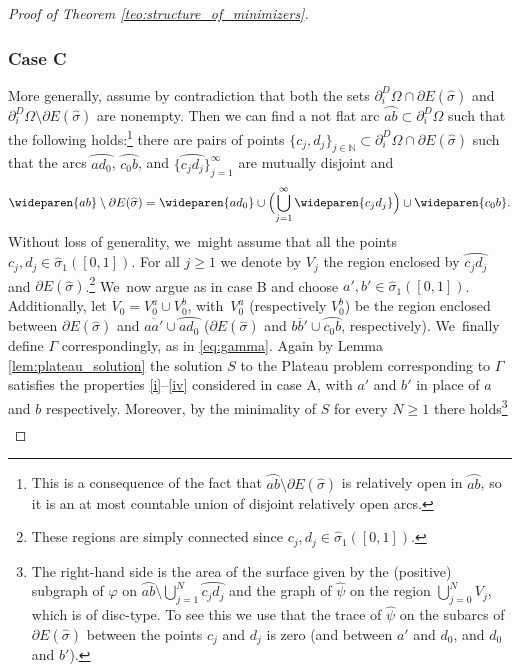 \documentclass[JEP,XML,SOM,Unicode, NoFloatCountersInSection,published]{cedram}
\let\arc\wideparen
\let\Om\Omega
\theoremstyle{definition}
\begin{document}
\begin{proof}[Proof of Theorem \ref{teo:structure_of_minimizers}]
\subsubsection*{Case C} More generally, assume by contradiction that both the sets $\partial_i^D\Om\cap\partial E(\widehat\sigma)$ and $\partial_i^D\Om\setminus\partial E(\widehat\sigma)$ are nonempty.
Then we can find a not flat arc $\arc{ab}\subset\partial_i^D\Om$ such that the following holds:\footnote{This is a consequence of the fact that $\arc{ab}\setminus\partial E(\widehat\sigma)$ is relatively open in $\arc{ab}$, so it is an at most countable union of disjoint relatively open arcs.} there are pairs of points $\{c_j,d_j\}_{j\in \mathbb N}\subset\partial_i^D\Om\cap\partial E(\widehat\sigma)$ such that the arcs $\arc{ad_0}$, $\arc{c_0b}$, and $\{\arc{c_jd_j}\}_{j=1}^\infty$ are mutually disjoint and
\begin{equation*}
\arc{ab}\setminus\partial E(\widehat\sigma)=\arc{ad_0}\cup\Bigl(\bigcup_{j=1}^\infty\arc{c_jd_j}\Bigr)\cup\arc{c_0b}.
\end{equation*}
Without loss of generality, we~might assume that all the points $c_j,d_j\in\widehat\sigma_1([0,1])$.
For all $j\ge1$ we denote by $V_j$ the region enclosed by $\arc{c_jd_j}$ and $\partial E(\widehat\sigma)$.\footnote{These regions are simply connected since $c_j,d_j\in\widehat\sigma_1([0,1])$.} We~now argue as in case B and choose $a',b'\in \widehat\sigma_1([0,1])$. Additionally, let $V_0=V_0^a\cup V_0^b$, with~$V_0^a$ (respectively $V_0^b$) be the region enclosed between $\partial E(\widehat\sigma)$ and $\overline{aa'}\cup\arc{ad_0}$ ($\partial E(\widehat\sigma)$ and $\overline{bb'}\cup\arc{c_0b}$, respectively). We~finally define $\Gamma$ correspondingly, as in \eqref{eq:gamma}.
Again by Lemma \ref{lem:plateau_solution} the solution $S$ to the Plateau problem corresponding to $\Gamma$ satisfies the properties \ref{i}--\ref{iv} considered in case A, with $a'$ and $b'$ in place of $a$ and $b$ respectively.
Moreover, by the minimality of $S$ for every $N\ge1$ there holds\footnote{The right-hand side is the area of the surface given by the (positive) subgraph of $\varphi$ on $\arc{ab}\setminus
\bigcup_{j=1}^N\arc{c_jd_j}$ and the graph of $\widehat\psi$ on the region $\bigcup_{j=0}^NV_j$, which is of disc-type.
To see this we use that the trace of $\widehat\psi$ on the
subarcs of $\partial E(\widehat\sigma)$ between the points $c_j$ and $d_j$
is zero (and between $a'$ and $d_0$, and $d_0$ and $b'$).}
\begin{multline}\label{eq:contradiction_bis}

\end{multline}
\end{proof}
\end{document}
